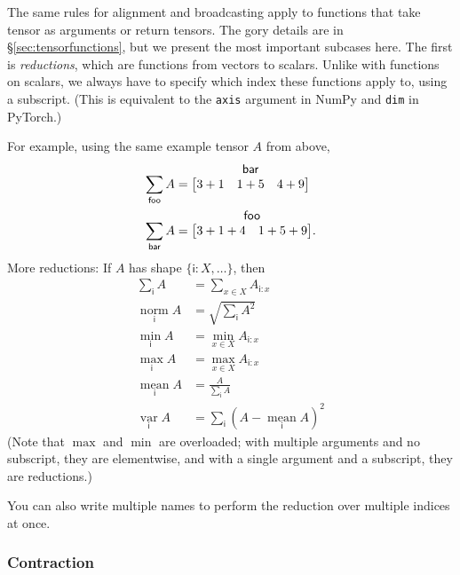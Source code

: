 \documentclass{article}
\makeatletter
\newcommand{\name}[1]{\mathsf{#1}}
\newcommand{\nsum}[1]{\mathop{\sum}_{\name{#1}}}
\newcommand{\nfun}[2]{\mathop{\text{#2}}\limits_{\name{#1}}}
\newcommand{\tuple}[1]{\{ #1\}}
\newcommand{\nmatrix}[3]{\name{#1}\begin{array}[b]{@{}c@{}}\name{#2}\\\begin{bmatrix}#3\end{bmatrix}\end{array}}
\makeatother
\begin{document}
The same rules for alignment and broadcasting apply to functions that take tensor as arguments or return tensors. The gory details are in \S\ref{sec:tensorfunctions}, but we present the most important subcases here. The first is \emph{reductions}, which are functions from vectors to scalars. Unlike with functions on scalars, we always have to specify which index these functions apply to, using a subscript. (This is equivalent to the \verb|axis| argument in NumPy and \verb|dim| in PyTorch.)

For example, using the same example tensor $A$ from above,
\begin{align*}
\nsum{foo} A &= \nmatrix{}{bar}{
  3+1 & 1+5 & 4+9
} \\
\nsum{bar} A &= \nmatrix{}{foo}{
  3+1+4 & 1+5+9
}.
\end{align*}
More reductions: If $A$ has shape $\tuple{\name{i}:X, \ldots}$, then
\begin{align*}
  \nsum{i} A &= \sum_{x \in X} A_{\name{i}: x} \\
  \nfun{i}{norm} A &= \sqrt{\nsum{i} A^2} \\
  \nfun{i}{min} A &= \min_{x \in X} A_{\name{i}: x} \\
  \nfun{i}{max} A &= \max_{x \in X} A_{\name{i}: x} \\
  \nfun{i}{mean} A &= \frac{A}{\nsum{i} A} \\
  \nfun{i}{var} A &= \nsum{i} (A - \nfun{i}{mean} A)^2
\end{align*}
(Note that $\max$ and $\min$ are overloaded; with multiple arguments and no subscript, they are elementwise, and with a single argument and a subscript, they are reductions.)

You can also write multiple names to perform the reduction over multiple indices at once.

\subsubsection{Contraction}
\end{document}
